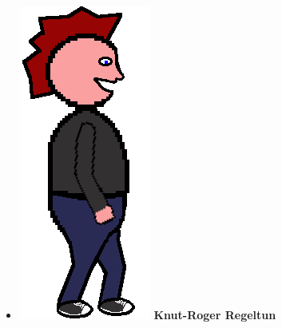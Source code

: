 \documentclass[paper=a4]{article}
\begin{document}
{\begin{itemize}
	\item \includegraphics[scale = 0.3]{images/rockboy.png} \textbf{Knut-Roger Regeltun}
\end{itemize}
}

\newpage
\end{document}
